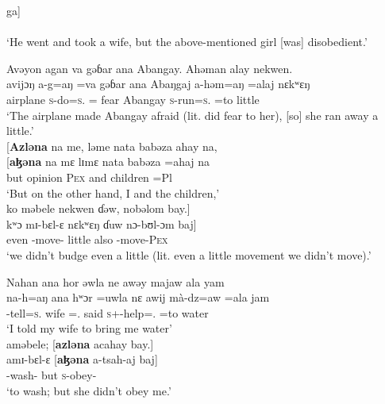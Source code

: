       \medskip
      ga]\\
      {\ADJ}\\
\glt  ‘He went and took a wife, but the above-mentioned girl [was] disobedient.’
\z 

\ea \label{ex:12:54}
Avəyon  agan  va  gəɓar  ana  Abangay.  Ahəman  alay  nekwen.\\  
\gll  avijɔŋ  a-g=aŋ       =va     gəɓar   ana   Abaŋgaj    a-həm=aŋ  =alaj   nɛkʷɛŋ \\     
      airplane  \textsc{s}-do=\textsc{s}.{\IO} ={\PRF}  fear  {\DAT} Abangay  \textsc{s}-run=\textsc{s}.{\IO}   =to    little  \\         
\glt ‘The airplane made Abangay afraid (lit. did fear to her), [so] she ran away a little.’\\

\medskip
\clearpage
{}[\textbf{Azləna}  na  me,  ləme  nata  babəza  ahay  na,\\  
\gll {}[\textbf{aɮəna} na mɛ lɪmɛ nata babəza =ahaj na\\ 
     but    {\PSP}  opinion  \textsc{Pex}  and  children  =Pl  {\PSP} \\
\glt ‘But on the other hand, I and the children,’\\

\medskip
ko  məbele  nekwen  ɗəw,  nobəlom  bay.]\\
\gll kʷɔ mɪ-bɛl-ɛ nɛkʷɛŋ ɗuw nɔ-bʊl-ɔm baj]\\
     even  {\NOM}{}-move-{\CL}  little  also  -move-\textsc{Pex}  {\NEG}\\
\glt  ‘we didn’t budge even a little (lit. even a little movement we didn’t move).’ 
\z 

\largerpage
\ea \label{ex:12:55}
Nahan  ana  hor  əwla  ne  awəy  majaw  ala  yam\\  
\gll  na-h=aŋ    ana  hʷɔr       =uwla    nɛ  awij   mà-dz=aw  =ala jam\\  
      {\oneS}-tell=\textsc{s}.{\IO}  {\DAT} wife  ={\oneS}.{\POSS}  {\oneS}  said      \textsc{s}+{\HOR}-help={\oneS}.{\IO}    =to  water\\  
\glt ‘I told my wife to bring me water’\\     

\medskip
aməbele;  [\textbf{azləna}  acahay  bay.]\\
\gll amɪ-bɛl-ɛ [\textbf{aɮəna} a-tsah-aj baj]\\
     {\DEP}-wash-{\CL}      but    \textsc{s}-obey-{\CL}  {\NEG}\\
\glt  ‘to wash; but she didn’t obey me.’ 
\z 

